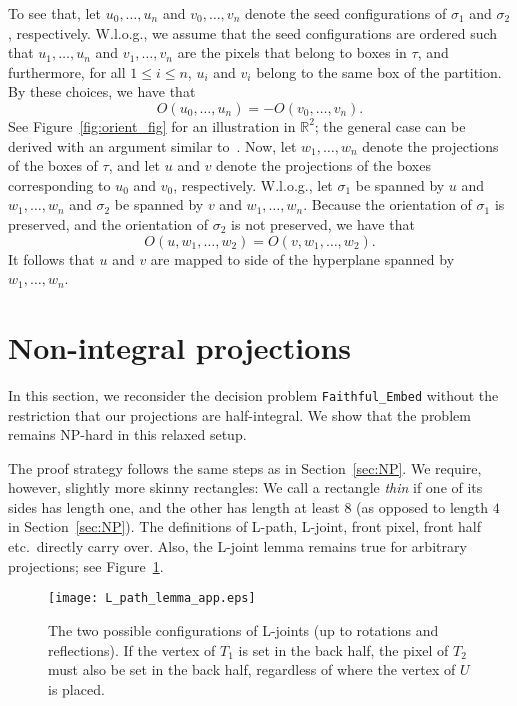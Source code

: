 \documentclass[12pt]{article}
\newcommand{\R}{\mathbb{R}}
\begin{document}
\begin{appendix}
To see that, let $u_0,\ldots,u_n$ and $v_0,\ldots,v_n$ denote the seed configurations of $\sigma_1$
and $\sigma_2$, respectively. W.l.o.g., we assume that the seed configurations are ordered such that
$u_1,\ldots,u_n$ and $v_1,\ldots,v_n$ are the pixels that belong to boxes in $\tau$, and
furthermore, for all $1\leq i\leq n$, $u_i$ and $v_i$ belong to the same box of the partition.
By these choices, we have that
$$O(u_0,\ldots,u_n)= -O(v_0,\ldots,v_n).$$
See Figure~\ref{fig:orient_fig} for an illustration in $\R^2$; 
the general case can be derived with an argument similar to~\cite[p.167]{ah-topologie}.
Now, let $w_1,\ldots,w_n$ denote the projections of the boxes of $\tau$, and let $u$ and $v$
denote the projections of the boxes corresponding to $u_0$ and $v_0$, respectively.
W.l.o.g., let $\sigma_1$ be spanned by $u$ and $w_1,\ldots,w_n$ and $\sigma_2$ be spanned
by $v$ and $w_1,\ldots,w_n$. Because the orientation of $\sigma_1$ is preserved, and the orientation
of $\sigma_2$ is not preserved, we have that
$$O(u,w_1,\ldots,w_2)=O(v,w_1,\ldots,w_2).$$
It follows that $u$ and $v$ are mapped to side of the hyperplane spanned by $w_1,\ldots,w_n$.

\section{Non-integral projections}\label{app:non-half-integral}
In this section, we reconsider the decision problem \texttt{Faithful\_Embed}
without the restriction that our projections are half-integral.
We show that the problem remains NP-hard in this relaxed setup.

The proof strategy follows the same steps as in Section~\ref{sec:NP}.
We require, however, slightly more skinny rectangles: We call a rectangle
\emph{thin} if one of its sides has length one, and the other has length at least $8$
(as opposed to length $4$ in Section~\ref{sec:NP}). The definitions of L-path, L-joint,
front pixel, front half etc.~directly carry over. Also, the L-joint lemma remains
true for arbitrary projections; see Figure~\ref{fig:L-joint-mod}.

\begin{figure}
\begin{center}
\texttt{[image: L\_path\_lemma\_app.eps]}
\end{center}
\caption{The two possible configurations of L-joints (up to rotations and reflections).
If the vertex of $T_1$ is set in the back half, the pixel of $T_2$ must also be set
in the back half, regardless of where the vertex of $U$ is placed.}
\label{fig:L-joint-mod}
\end{figure}


\end{appendix}
\end{document}
